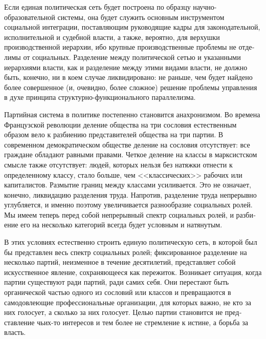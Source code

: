 \documentclass{book}
\begin{document}
Если единая политическая сеть будет построена по образцу научно-образовательной системы, она будет служить основным инструментом социальной интеграции, поставляющим руково­дящие кадры для законодательной, исполнительной и судебной власти, а также, вероятно, для верхушки производственной иерархии, ибо крупные производственные проблемы не отде­лимы от социальных. Разделение между политической сетью и указанными иерархиями власти, как и разделение между этими видами власти, не должно быть, конечно, ни в коем случае лик­видировано: не раньше, чем будет найдено более совершенное (и, очевидно, более сложное) решение проблемы управления в духе принципа структурно-функционального параллелизма.

Партийная система в политике постепенно становится ана­хронизмом. Во времена Французской революции деление об­щества на три сословия естественным образом вело к разбиению представителей общества на три партии. В современном демократическом обществе деление на сословия отсутствует: все граждане обладают равными правами. Четкое деление на классы в марксистском смысле также отсутствует: людей, которых нельзя без натяжки отнести к определенному классу, стало больше, чем <<классических>> рабочих или капиталистов. Размытие границ между классами усиливается. Это не озна­чает, конечно, ликвидацию разделения труда. Напротив, разде­ление труда непрерывно углубляется, и именно поэтому увеличивается разнообразие социальных ролей. Мы имеем теперь перед собой непрерывный спектр социальных ролей, и разби­ение его на несколько категорий всегда будет условным и на­тянутым.

В этих условиях естественно строить единую политическую сеть, в которой был бы представлен весь спектр социальных ролей; фиксированное разделение на несколько партий, неиз­менное в течение десятилетий, представляет собой искусствен­ное явление, сохраняющееся как пережиток. Возникает ситу­ация, когда партии существуют ради партий, ради самих себя. Они перестают быть органической частью одного из сословий или классов и превращаются в самодовлеющие профессиональ­ные организации, для которых важно, не кто  за них голосует, а сколько  за них голосует. Целью партии становится не пред­ставление чьих-то интересов и тем более не стремление к исти­не, а борьба за власть.
\end{document}
